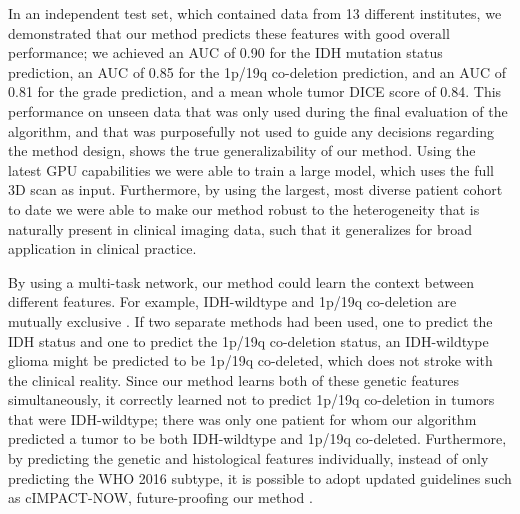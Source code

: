 In an independent test set, which contained data from 13 different institutes, we demonstrated that our method predicts these features with good overall performance; we achieved an \gls{AUC} of 0.90 for the \gls{IDH} mutation status prediction, an \gls{AUC} of 0.85 for the 1p/19q co-deletion prediction, and an \gls{AUC} of 0.81 for the grade prediction, and a mean whole \gls{tumor} DICE score of 0.84.
This performance on unseen data that was only used during the final evaluation of the algorithm, and that was purposefully not used to guide any decisions regarding the method design, shows the true generalizability of our method.
Using the latest GPU capabilities we were able to train a large model, which uses the full 3D scan as input.
Furthermore, by using the largest, most diverse patient cohort to date we were able to make our method robust to the heterogeneity that is naturally present in clinical imaging data, such that it generalizes for broad application in clinical practice.

By using a multi-task network, our method could learn the context between different features.
For example, \gls{IDH}-wildtype and 1p/19q co-deletion are mutually exclusive \autocite{labussi2018idh}.
If two separate methods had been used, one to predict the \gls{IDH} status and one to predict the 1p/19q co-deletion status, an \gls{IDH}-wildtype glioma might be predicted to be 1p/19q co-deleted, which does not stroke with the clinical reality.
Since our method learns both of these genetic features simultaneously, it correctly learned not to predict 1p/19q co-deletion in \glspl{tumor} that were \gls{IDH}-wildtype; there was only one patient for whom our algorithm predicted a \gls{tumor} to be both \gls{IDH}-wildtype and 1p/19q co-deleted.
Furthermore, by predicting the genetic and histological features individually, instead of only predicting the \gls{WHO} 2016 subtype, it is possible to adopt updated guidelines such as cIMPACT-NOW, future-proofing our method \autocite{lous2020impactnow}.

